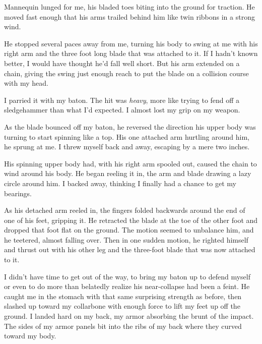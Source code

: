 





Mannequin lunged for me, his bladed toes biting into the ground for traction.  He moved fast enough that his arms trailed behind him like twin ribbons in a strong wind.



He stopped several paces away from me, turning his body to swing at me with his right arm and the three foot long blade that was attached to it.  If I hadn't known better, I would have thought he'd fall well short. But his arm extended on a chain, giving the swing just enough reach to put the blade on a collision course with my head.



I parried it with my baton.  The hit was \emph{heavy}, more like trying to fend off a sledgehammer than what I'd expected.  I almost lost my grip on my weapon.



As the blade bounced off my baton, he reversed the direction his upper body was turning to start spinning like a top.  His one attached arm hurtling around him, he sprung at me.  I threw myself back and away, escaping by a mere two inches.



His spinning upper body had, with his right arm spooled out, caused the chain to wind around his body.  He began reeling it in, the arm and blade drawing a lazy circle around him.  I backed away, thinking I finally had a chance to get my bearings.



As his detached arm reeled in, the fingers folded backwards around the end of one of his feet, gripping it.  He retracted the blade at the toe of the other foot and dropped that foot flat on the ground.  The motion seemed to unbalance him, and he teetered, almost falling over.  Then in one sudden motion, he righted himself and thrust out with his other leg and the three-foot blade that was now attached to it.



I didn't have time to get out of the way, to bring my baton up to defend myself or even to do more than belatedly realize his near-collapse had been a feint.  He caught me in the stomach with that same surprising strength as before, then slashed up toward my collarbone with enough force to lift my feet up off the ground.  I landed hard on my back, my armor absorbing the brunt of the impact.  The sides of my armor panels bit into the ribs of my back where they curved toward my body.



